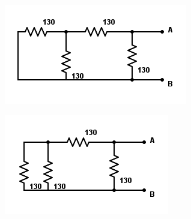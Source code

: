 \documentclass[11pt]{article}
\begin{document}
    \begin{figure}[H]
        \centering
        \begin{subfigure}{0.3\textwidth}
            \centering
            \includegraphics[width=\textwidth]{1_simplify1.png}
            \caption{}
            \label{fig:1_simplify1}
        \end{subfigure}
        \begin{subfigure}{0.3\textwidth}
            \centering
            \includegraphics[width=\textwidth]{1_simplify2.png}
            \caption{}
            \label{fig:1_simplify2}
        \end{subfigure}
        \begin{subfigure}{0.3\textwidth}
            \centering

\end{subfigure}
\end{figure}
\end{document}
